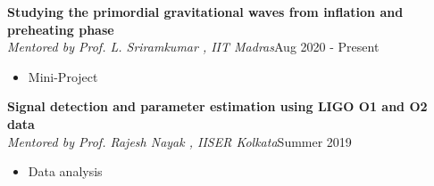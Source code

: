 \documentclass[margin, centered]{res}
\begin{document}
\begin{resume}
\textbf{Studying the primordial gravitational waves from inflation and preheating phase} \\
\emph{Mentored by Prof. L. Sriramkumar , IIT Madras}\hfill Aug 2020 - Present
\begin{itemize}[leftmargin=*]
    \item Mini-Project
\end{itemize}

\textbf{Signal detection and parameter estimation using LIGO O1 and O2 data} \\
\emph{Mentored by Prof. Rajesh Nayak , IISER Kolkata}\hfill Summer 2019
\begin{itemize}[leftmargin=*]
    \item Data analysis
\end{itemize}



\begin{comment}




\section{Projects}
\begin{itemize}[leftmargin=*]
	\item \textbf{Aditya Vijaykumar}, MV Saketh, Sumit Kumar, Parameswaran Ajith, Tirthankar Roy Choudhury.\\
	\textit{Probing the cosmological large-scale structure using gravitational-wave observations} \\
	\textit{(manuscript under LIGO PnP review, to be submitted to arXiv soon)}
	\\
	\item \textbf{Aditya Vijaykumar}, Shasvath Kapadia, Parameswaran Ajith.\\
	\textit{Constraining the time-variation of the Gravitational constant using gravitational-wave observations of binary neutron stars} \\
	\textit{(manuscript under LIGO PnP review, to be submitted to arXiv soon)}
	\\
	\item \textbf{Aditya Vijaykumar}, Nathan Johnson-McDaniel, Rahul Kashyap, Arunava Mukherjee, Parameswaran Ajith.\\	
	\textit{Constraints on Black Hole Mimickers from the Gravitational-wave Transient Catalog (GWTC) -1 }
	\\
	\item Apratim Ganguly, \textbf{Aditya Vijaykumar}, Abhirup Ghosh, Parameswaran Ajith.\\	
	\textit{Probing General Relativity from the consistency of inspiral and merger-ringdown of Binary Black Holes}



\end{comment}
\end{resume}
\end{document}
